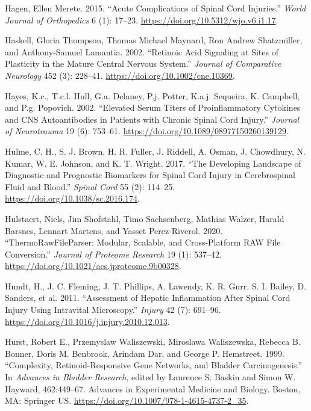 \documentclass[9pt,lineno]{elife}
\newlength{\cslhangindent}
\newlength{\cslentryspacingunit} %
\newenvironment{CSLReferences}[2] %
 {%
  \setlength{\parindent}{0pt}
  \ifodd #1
  \let\oldpar\par
  \def\par{\hangindent=\cslhangindent\oldpar}
  \fi
  \setlength{\parskip}{#2\cslentryspacingunit}
 }%
 {}
\begin{document}
\begin{landscape}
\begin{landscape}
\begin{CSLReferences}{1}{0}
\leavevmode{}%
Hagen, Ellen Merete. 2015. {``Acute Complications of Spinal Cord Injuries.''} \emph{World Journal of Orthopedics} 6 (1): 17--23. \url{https://doi.org/10.5312/wjo.v6.i1.17}.

\leavevmode{}%
Haskell, Gloria Thompson, Thomas Michael Maynard, Ron Andrew Shatzmiller, and Anthony-Samuel Lamantia. 2002. {``Retinoic Acid Signaling at Sites of Plasticity in the Mature Central Nervous System.''} \emph{Journal of Comparative Neurology} 452 (3): 228--41. \url{https://doi.org/10.1002/cne.10369}.

\leavevmode{}%
Hayes, K.c., T.c.l. Hull, G.a. Delaney, P.j. Potter, K.a.j. Sequeira, K. Campbell, and P.g. Popovich. 2002. {``Elevated {Serum Titers} of {Proinflammatory Cytokines} and {CNS Autoantibodies} in {Patients} with {Chronic Spinal Cord Injury}.''} \emph{Journal of Neurotrauma} 19 (6): 753--61. \url{https://doi.org/10.1089/08977150260139129}.

\leavevmode{}%
Hulme, C. H., S. J. Brown, H. R. Fuller, J. Riddell, A. Osman, J. Chowdhury, N. Kumar, W. E. Johnson, and K. T. Wright. 2017. {``The Developing Landscape of Diagnostic and Prognostic Biomarkers for Spinal Cord Injury in Cerebrospinal Fluid and Blood.''} \emph{Spinal Cord} 55 (2): 114--25. \url{https://doi.org/10.1038/sc.2016.174}.

\leavevmode{}%
Hulstaert, Niels, Jim Shofstahl, Timo Sachsenberg, Mathias Walzer, Harald Barsnes, Lennart Martens, and Yasset Perez-Riverol. 2020. {``{ThermoRawFileParser}: {Modular}, {Scalable}, and {Cross-Platform RAW File Conversion}.''} \emph{Journal of Proteome Research} 19 (1): 537--42. \url{https://doi.org/10.1021/acs.jproteome.9b00328}.

\leavevmode{}%
Hundt, H., J. C. Fleming, J. T. Phillips, A. Lawendy, K. R. Gurr, S. I. Bailey, D. Sanders, et al. 2011. {``Assessment of Hepatic Inflammation After Spinal Cord Injury Using Intravital Microscopy.''} \emph{Injury} 42 (7): 691--96. \url{https://doi.org/10.1016/j.injury.2010.12.013}.

\leavevmode{}%
Hurst, Robert E., Przemyslaw Waliszewski, Miroslawa Waliszewska, Rebecca B. Bonner, Doris M. Benbrook, Arindam Dar, and George P. Hemstreet. 1999. {``Complexity, {Retinoid-Responsive Gene Networks}, and {Bladder Carcinogenesis}.''} In \emph{Advances in {Bladder Research}}, edited by Laurence S. Baskin and Simon W. Hayward, 462:449--67. Advances in {Experimental Medicine} and {Biology}. {Boston, MA}: {Springer US}. \url{https://doi.org/10.1007/978-1-4615-4737-2_35}.


\end{CSLReferences}
\end{landscape}
\end{landscape}
\end{document}

